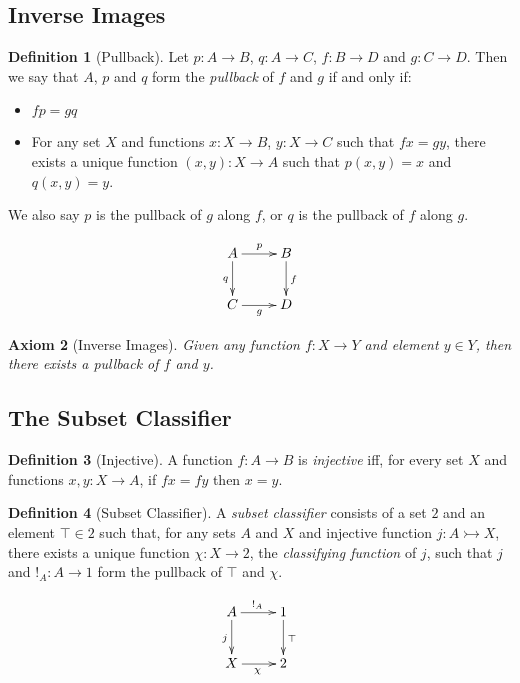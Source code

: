 \documentclass{book}
\newtheorem{ax}{Axiom}[chapter]
\theoremstyle{definition}
\newtheorem{df}[ax]{Definition}
\begin{document}
\subsection{Inverse Images}

\begin{df}[Pullback]
Let $p : A \rightarrow B$, $q : A \rightarrow C$, $f : B \rightarrow D$ and $g : C \rightarrow D$. Then we say that $A$, $p$ and $q$ form the \emph{pullback} of $f$ and $g$ if and only if:
\begin{itemize}
\item $fp = gq$
\item For any set $X$ and functions $x : X \rightarrow B$, $y : X \rightarrow C$ such that $fx = gy$, there exists a unique function $(x,y) : X \rightarrow A$ such that $p (x,y) = x$ and $q(x,y) = y$.
\end{itemize}
We also say $p$ is the pullback of $g$ along $f$, or $q$ is the pullback of $f$ along $g$.
\end{df}

\[ \xymatrix{
A \ar[r]^p \ar[d]_q & B \ar[d]^f \\
C \ar[r]_g & D
} \]

\begin{ax}[Inverse Images]
Given any function $f : X \rightarrow Y$ and element $y \in Y$, then there exists a pullback of $f$ and $y$.
\end{ax}

\subsection{The Subset Classifier}

\begin{df}[Injective]
A function $f : A \rightarrow B$ is \emph{injective} iff, for every set $X$ and functions $x,y : X \rightarrow A$, if $fx = fy$ then $x = y$.
\end{df}

\begin{df}[Subset Classifier]
A \emph{subset classifier} consists of a set $2$ and an element $\top \in 2$ such that, for any sets $A$ and $X$ and injective function $j : A \rightarrowtail X$, there exists a unique function $\chi : X \rightarrow 2$, the \emph{classifying function} of $j$, such that $j$ and $!_A : A \rightarrow 1$ form the pullback of $\top$ and $\chi$.
\end{df}

\[ \xymatrix{
A \ar[r]^{!_A} \ar[d]_j & 1 \ar[d]^{\top} \\
X \ar[r]_\chi & 2
} \]
\end{document}
